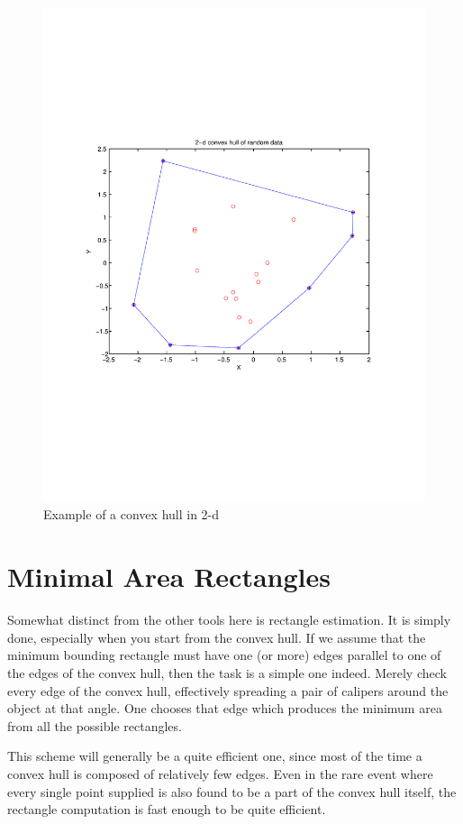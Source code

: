 \documentclass[a4paper,11pt]{article}
\begin{document}
\begin{figure}
\centering
    \includegraphics[width=5in]{convhull.pdf}
        \caption{Example of a convex hull in 2-d}
\end{figure}

\bigskip

\section{Minimal Area Rectangles}

Somewhat distinct from the other tools here is rectangle estimation. It is simply done,
especially when you start from the convex hull. If we assume that the minimum bounding
rectangle must have one (or more) edges parallel to one of the edges of the convex hull,
then the task is a simple one indeed. Merely check every edge of the convex hull,
effectively spreading a pair of calipers around the object at that angle. One chooses that
edge which produces the minimum area from all the possible rectangles.

This scheme will generally be a quite efficient one, since most of the time a convex hull 
is composed of relatively few edges. Even in the rare event where every single point
supplied is also found to be a part of the convex hull itself, the rectangle computation is
fast enough to be quite efficient.
\end{document}
